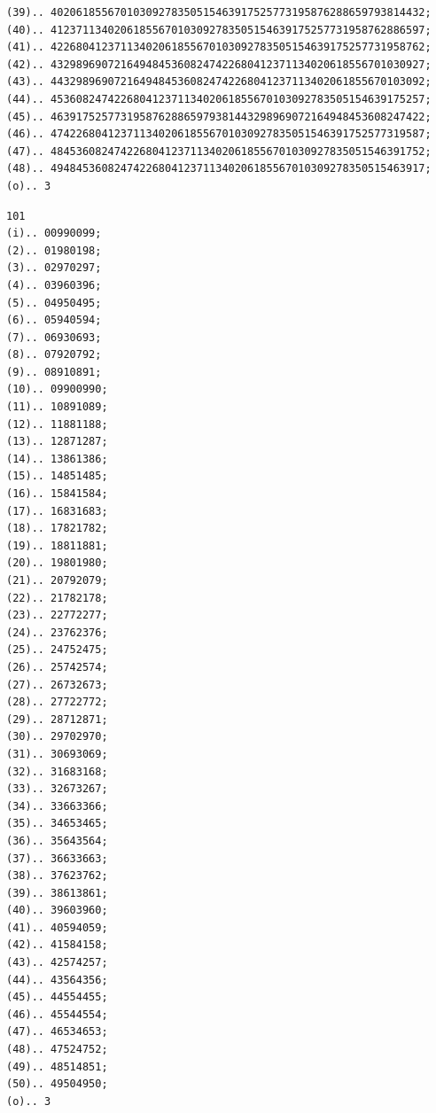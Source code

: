 \documentclass[10pt,a4paper]{article}
\begin{document}
\begin{verbatim}
(39).. 40206185567010309278350515463917525773195876288659793814432;
(40).. 41237113402061855670103092783505154639175257731958762886597;
(41).. 42268041237113402061855670103092783505154639175257731958762;
(42).. 43298969072164948453608247422680412371134020618556701030927;
(43).. 44329896907216494845360824742268041237113402061855670103092;
(44).. 45360824742268041237113402061855670103092783505154639175257;
(45).. 46391752577319587628865979381443298969072164948453608247422;
(46).. 47422680412371134020618556701030927835051546391752577319587;
(47).. 48453608247422680412371134020618556701030927835051546391752;
(48).. 49484536082474226804123711340206185567010309278350515463917;
(o).. 3
\end{verbatim}

\newpage
\setcounter{page}{426}

\begin{verbatim}
101
(i).. 00990099;
(2).. 01980198;
(3).. 02970297;
(4).. 03960396;
(5).. 04950495;
(6).. 05940594;
(7).. 06930693;
(8).. 07920792;
(9).. 08910891;
(10).. 09900990;
(11).. 10891089;
(12).. 11881188;
(13).. 12871287;
(14).. 13861386;
(15).. 14851485;
(16).. 15841584;
(17).. 16831683;
(18).. 17821782;
(19).. 18811881;
(20).. 19801980;
(21).. 20792079;
(22).. 21782178;
(23).. 22772277;
(24).. 23762376;
(25).. 24752475;
(26).. 25742574;
(27).. 26732673;
(28).. 27722772;
(29).. 28712871;
(30).. 29702970;
(31).. 30693069;
(32).. 31683168;
(33).. 32673267;
(34).. 33663366;
(35).. 34653465;
(36).. 35643564;
(37).. 36633663;
(38).. 37623762;
(39).. 38613861;
(40).. 39603960;
(41).. 40594059;
(42).. 41584158;
(43).. 42574257;
(44).. 43564356;
(45).. 44554455;
(46).. 45544554;
(47).. 46534653;
(48).. 47524752;
(49).. 48514851;
(50).. 49504950;
(o).. 3
\end{verbatim}

\newpage
\setcounter{page}{427}
\end{document}
